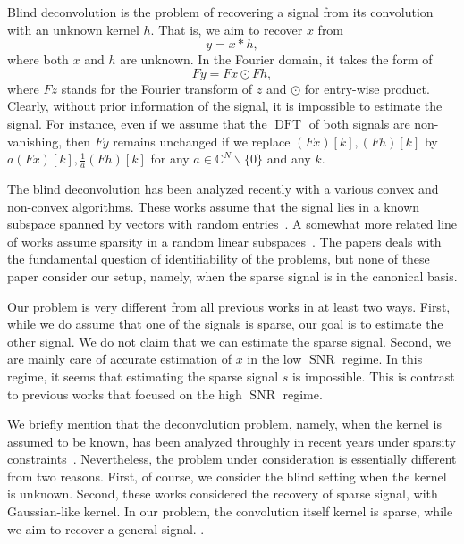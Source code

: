 \documentclass[journal]{IEEEtran}
\numberwithin{equation}{section}
\numberwithin{figure}{section}
\theoremstyle{plain}
\theoremstyle{definition}
\theoremstyle{remark}
\theoremstyle{plain}
\theoremstyle{remark}
\theoremstyle{plain}
\theoremstyle{plain}
\newcommand{\CN}{\mathbb{C}^N}
\newcommand{\DFT}{\operatorname{DFT}}
\newcommand{\SNR}{\operatorname{SNR}}
\begin{document}
Blind deconvolution is the problem of recovering a signal from its convolution with an unknown kernel $h$. That is, we aim to recover  $x$ from
\begin{equation}
y = x\ast h,
\end{equation}
where both $x$ and $h$ are unknown. In the Fourier domain, it takes the form of 
\begin{equation}
Fy = Fx \odot Fh,
\end{equation}
where $Fz$ stands for the Fourier transform of $z$ and $\odot$ for entry-wise product.
Clearly, without prior information of the signal, it is impossible to estimate the signal. For instance, even if we assume that the $\DFT$ of both signals are non-vanishing, then $Fy$ remains unchanged if we replace $(Fx)[k],(Fh)[k]$ by $a(Fx)[k],\frac{1}{a}(Fh)[k]$ for any $a\in\CN\backslash\{0\}$ and any $k$.


The blind deconvolution  has been analyzed recently with a various convex and non-convex algorithms. These works assume that the signal lies in a known  subspace spanned by vectors with random entries~\cite{ahmed2014blind,li2016rapid,ling2017blind}. A somewhat more related line of works assume sparsity in a random linear subspaces~\cite{lee2017blind,ling2015self,chi2016guaranteed}. 
The papers 
\cite{choudhary2014sparse,li2016identifiability,kech2017optimal,li2015unified} deals with the fundamental question of identifiability of the problems, but none of these paper consider our setup, namely, when the sparse signal is in the canonical basis. 

Our problem is very different from all previous works in at least two ways. First, 
while we do assume that one of the signals is sparse,  our goal is to estimate the other signal. We do not claim that we can estimate the sparse signal. Second, we are mainly care of accurate estimation of $x$ in the low $\SNR$ regime. In this regime, it seems that estimating the sparse signal $s$ is impossible. This is contrast to previous works that focused on the high $\SNR$ regime.

We briefly mention that the deconvolution problem, namely, when the kernel is assumed to be known, has been analyzed throughly in recent years under sparsity constraints~\cite{bendory2016robust,bendory2017robust,bendory2016stable,boyer2017adapting,bernstein2017deconvolution,de2012exact,azais2015spike,duval2015exact,duval2015sparse}.  Nevertheless, the problem under consideration is essentially different  from two reasons. First, of course, we consider the blind setting when the kernel is unknown. Second, these works considered the recovery of sparse signal, with Gaussian-like kernel. In our problem, the convolution itself kernel is sparse, while we aim to recover a general signal. 
. 
\end{document}
